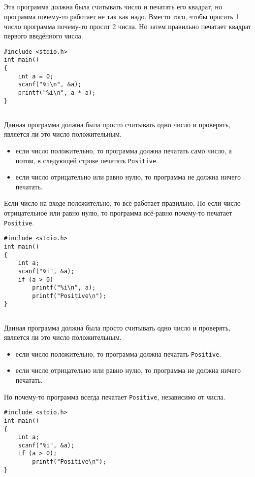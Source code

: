 \documentclass{article}
\begin{document}
\subsection{}
Эта программа должна была считывать число и печатать его квадрат, но программа почему-то работает не так как надо. Вместо того, чтобы просить 1 число программа почему-то просит 2 числа.
Но затем правильно печатает квадрат первого введённого числа.
\begin{lstlisting}
#include <stdio.h>
int main()
{
    int a = 0;
    scanf("%i\n", &a);
    printf("%i\n", a * a);
}
\end{lstlisting}


\subsection{}
Данная программа должна была просто считывать одно число и проверять, является ли это число положительным.  
\begin{itemize}
\item если число положительно, то программа должна печатать само число, а потом, в следующей строке печатать \texttt{Positive}.
\item если число отрицательно или равно нулю, то программа не должна ничего печатать.
\end{itemize}
Если число на входе положительно, то всё работает правильно.
Но если число отрицательное или равно нулю, то программа всё-равно почему-то печатает \texttt{Positive}.
\begin{lstlisting}
#include <stdio.h>
int main()
{
    int a;
    scanf("%i", &a);
    if (a > 0)
        printf("%i\n", a);
        printf("Positive\n");
}
\end{lstlisting}

\subsection{}
Данная программа должна была просто считывать одно число и проверять, является ли это число положительным.
\begin{itemize}
\item если число положительно, то программа должна печатать \texttt{Positive}.
\item если число отрицательно или равно нулю, то программа не должна ничего печатать.
\end{itemize}
Но почему-то программа всегда печатает \texttt{Positive}, независимо от числа.
\begin{lstlisting}
#include <stdio.h>
int main()
{
    int a;
    scanf("%i", &a);
    if (a > 0);
        printf("Positive\n");
}
\end{lstlisting}
\end{document}

